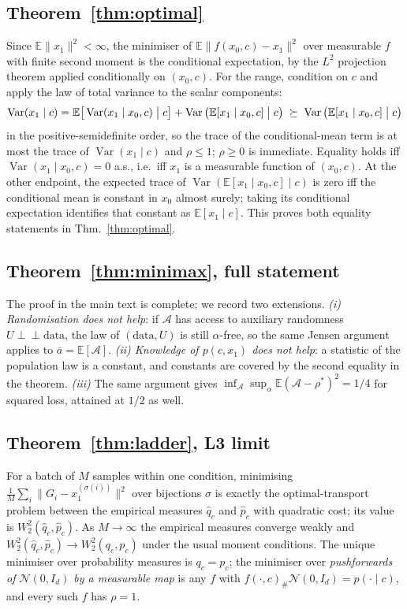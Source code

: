 \documentclass{article}
\theoremstyle{plain}
\newcommand{\Var}{\operatorname{Var}}
\newcommand{\Eop}{\mathbb{E}}
\newcommand{\Ncal}{\mathcal{N}}
\newcommand{\indep}{\perp\!\!\!\perp}
\begin{document}
\subsection{Theorem~\ref{thm:optimal}}
Since $\Eop\|x_1\|^2<\infty$, the minimiser of $\Eop\|f(x_0,c)-x_1\|^2$ over measurable
$f$ with finite second moment is the conditional expectation, by the $L^2$ projection
theorem applied conditionally on $(x_0,c)$. For
the range, condition on $c$ and apply the law of total variance to the scalar
components:
\[
  \Var(x_1\mid c)=\Eop\big[\Var(x_1\mid x_0,c)\bigm|c\big]
  +\Var\big(\Eop[x_1\mid x_0,c]\bigm|c\big)\;\succeq\;
  \Var\big(\Eop[x_1\mid x_0,c]\bigm|c\big)
\]
in the positive-semidefinite order, so the trace of the conditional-mean term is at most
the trace of $\Var(x_1\mid c)$ and $\rho\le1$; $\rho\ge0$ is immediate. Equality holds
iff $\Var(x_1\mid x_0,c)=0$ a.s., i.e.\ iff $x_1$ is a measurable function of
$(x_0,c)$. At the other endpoint, the expected trace of
$\Var(\Eop[x_1\mid x_0,c]\mid c)$ is zero iff the conditional mean is constant in
$x_0$ almost surely; taking its conditional expectation identifies that constant as
$\Eop[x_1\mid c]$. This proves both equality statements in
Thm.~\ref{thm:optimal}.

\subsection{Theorem~\ref{thm:minimax}, full statement}
The proof in the main text is complete; we record two extensions. \emph{(i)
Randomisation does not help}: if $\mathcal A$ has access to auxiliary randomness
$U\indep\text{data}$, the law of $(\text{data},U)$ is still $\alpha$-free, so the same
Jensen argument applies to $\bar a=\Eop[\mathcal A]$. \emph{(ii) Knowledge of
$p(c,x_1)$ does not help}: a statistic of the population law is a constant, and
constants are covered by the second equality in the theorem. \emph{(iii)} The same
argument gives $\inf_{\mathcal A}\sup_\alpha\Eop(\mathcal A-\rho^\ast)^2=1/4$ for
squared loss, attained at $1/2$ as well.

\subsection{Theorem~\ref{thm:ladder}, L3 limit}
For a batch of $M$ samples within one condition, minimising
$\frac1M\sum_i\|G_i-x_1^{(\sigma(i))}\|^2$ over bijections $\sigma$ is exactly the
optimal-transport problem between the empirical measures $\hat q_c$ and
$\hat p_c$ with quadratic cost; its value is $W_2^2(\hat q_c,\hat p_c)$. As
$M\to\infty$ the empirical measures converge weakly and
$W_2^2(\hat q_c,\hat p_c)\to W_2^2(q_c,p_c)$ under the usual moment conditions. The
unique minimiser over probability measures is $q_c=p_c$; the minimiser over
\emph{pushforwards of $\Ncal(0,I_d)$ by a measurable map} is any $f$ with
$f(\cdot,c)_\#\Ncal(0,I_d)=p(\cdot\mid c)$, and every such $f$ has $\rho=1$.
\end{document}
